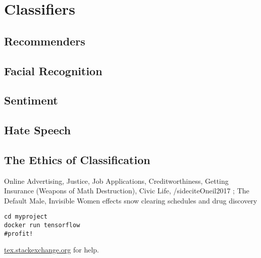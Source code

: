 \setchapterpreamble[u]{\margintoc}
\chapter{Classifiers}

\section{Recommenders}
\section{Facial Recognition}
\section{Sentiment}
\section{Hate Speech}
\section{The Ethics of Classification}

Online Advertising, Justice, Job Applications, Creditworthiness, Getting Insurance (Weapons of Math Destruction), Civic Life, /sidecite{Oneil2017} ; The Default Male, Invisible Women effects snow clearing schedules and drug discovery 

\begin{lstlisting}[style=kaolstplain,linewidth=1.5\textwidth]
cd myproject
docker run tensorflow
#profit!
\end{lstlisting}

\url{tex.stackexchange.org} for help.
